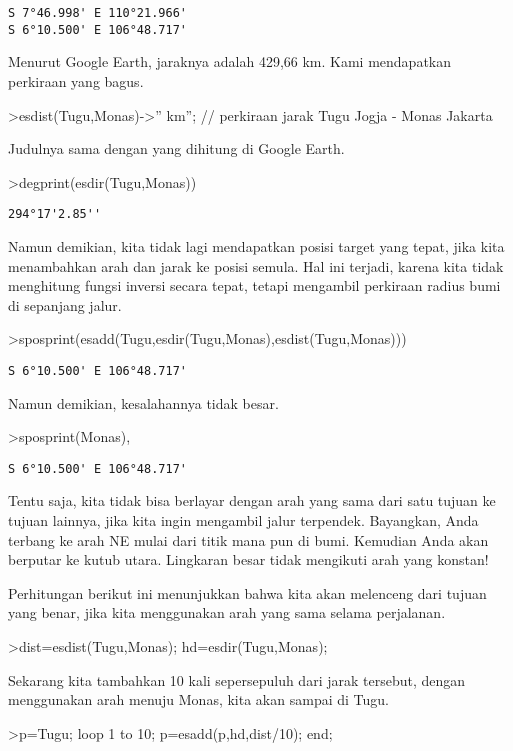 \documentclass[
]{book}
\begin{document}
\begin{verbatim}
S 7°46.998' E 110°21.966'
S 6°10.500' E 106°48.717'
\end{verbatim}

Menurut Google Earth, jaraknya adalah 429,66 km. Kami mendapatkan perkiraan yang bagus.

\textgreater esdist(Tugu,Monas)-\textgreater'' km''; // perkiraan jarak Tugu Jogja - Monas Jakarta

Judulnya sama dengan yang dihitung di Google Earth.

\textgreater degprint(esdir(Tugu,Monas))

\begin{verbatim}
294°17'2.85''
\end{verbatim}

Namun demikian, kita tidak lagi mendapatkan posisi target yang tepat, jika kita menambahkan arah dan jarak ke posisi semula. Hal ini terjadi, karena kita tidak menghitung fungsi inversi secara tepat, tetapi mengambil perkiraan radius bumi di sepanjang jalur.

\textgreater sposprint(esadd(Tugu,esdir(Tugu,Monas),esdist(Tugu,Monas)))

\begin{verbatim}
S 6°10.500' E 106°48.717'
\end{verbatim}

Namun demikian, kesalahannya tidak besar.

\textgreater sposprint(Monas),

\begin{verbatim}
S 6°10.500' E 106°48.717'
\end{verbatim}

Tentu saja, kita tidak bisa berlayar dengan arah yang sama dari satu tujuan ke tujuan lainnya, jika kita ingin mengambil jalur terpendek. Bayangkan, Anda terbang ke arah NE mulai dari titik mana pun di bumi. Kemudian Anda akan berputar ke kutub utara. Lingkaran besar tidak mengikuti arah yang konstan!

Perhitungan berikut ini menunjukkan bahwa kita akan melenceng dari tujuan yang benar, jika kita menggunakan arah yang sama selama perjalanan.

\textgreater dist=esdist(Tugu,Monas); hd=esdir(Tugu,Monas);

Sekarang kita tambahkan 10 kali sepersepuluh dari jarak tersebut, dengan menggunakan arah menuju Monas, kita akan sampai di Tugu.

\textgreater p=Tugu; loop 1 to 10; p=esadd(p,hd,dist/10); end;
\end{document}
